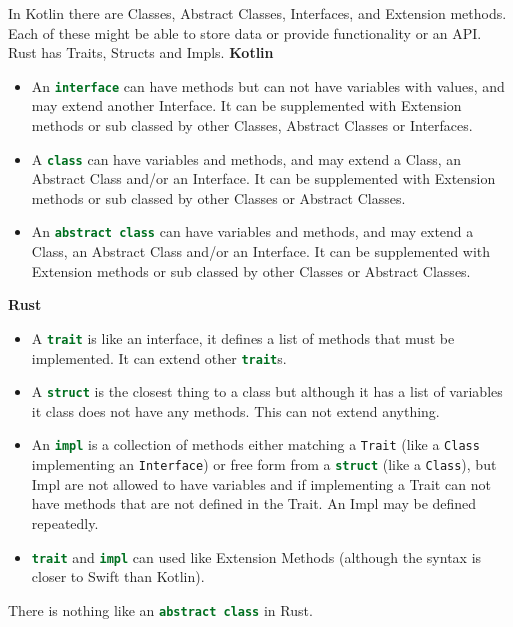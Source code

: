 \documentclass[a4paper,11pt]{article}
\begin{document}
In Kotlin there are Classes, Abstract Classes, Interfaces, and Extension methods. Each of these might be able to store data or provide functionality or an API.
Rust has Traits, Structs and Impls.
\newline
\textbf{Kotlin}
\begin{itemize}
  \item An \lstinline[language=Kotlin]{interface} can have methods but can not have variables with values, and may extend another Interface. It can be supplemented with Extension methods or sub classed by other Classes, Abstract Classes or Interfaces.
  \item A \lstinline[language=Kotlin]{class} can have variables and methods, and may extend a Class, an Abstract Class and/or an Interface. It can be supplemented with Extension methods or sub classed by other Classes or Abstract Classes.
  \item An \lstinline[language=Kotlin]{abstract class} can have variables and methods, and may extend a Class, an Abstract Class and/or an Interface. It can be supplemented with Extension methods or sub classed by other Classes or Abstract Classes.
\end{itemize}
\textbf{Rust}
\begin{itemize}
  \item A \lstinline[language=Rust]{trait} is like an interface, it defines a list of methods that must be implemented. It can extend other \lstinline[language=Rust]{trait}s.
  \item A \lstinline[language=Rust]{struct} is the closest thing to a class but although it has a list of variables it class does not have any methods. This can not extend anything.
  \item An \lstinline[language=Rust]{impl} is a collection of methods either matching a \lstinline[language=Rust]{Trait} (like a \lstinline[language=Kotlin]{Class} implementing an \lstinline[language=Kotlin]{Interface}) or free form from a \lstinline[language=Rust]{struct} (like a \lstinline[language=Kotlin]{Class}), but Impl are not allowed to have variables and if implementing a Trait can not have methods that are not defined in the Trait. An Impl may be defined repeatedly.
  \item \lstinline[language=Rust]{trait} and \lstinline[language=Rust]{impl} can used like Extension Methods (although the syntax is closer to Swift than Kotlin).
\end{itemize}

There is nothing like an \lstinline[language=Kotlin]{abstract class} in Rust.
\end{document}
